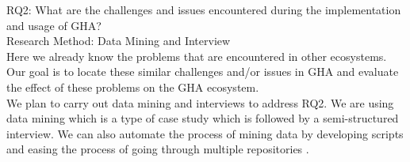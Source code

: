 \documentclass[conference]{IEEEtran}
\begin{document}
RQ2: What are the challenges and issues encountered during the implementation and usage of GHA?\\

Research Method: Data Mining and Interview\\

	Here we already know the problems that are encountered in other ecosystems. Our goal is to locate these similar challenges and/or issues in GHA and evaluate the effect of these problems on the GHA ecosystem.\\

	We plan to carry out data mining and interviews to address RQ2. We are using data mining which is  a type of case study which is followed by a semi-structured interview. We can also automate the process of mining data by developing scripts and easing the process of going through multiple repositories \cite{b20}.\\
\end{document}
